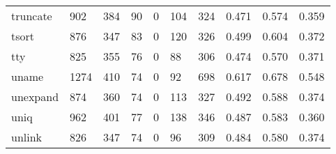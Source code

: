 \begin{longtable}{lp{2.0cm}p{2.0cm}p{2.0cm}p{2.0cm}p{2.0cm}p{2.0cm}p{2.0cm}p{2.0cm}p{2.0cm}}
truncate  &                    902 &                                384 &                                90 &                                0 &                               104 &                             324 &                                   0.471 &                                  0.574 &                                0.359 \\
tsort     &                    876 &                                347 &                                83 &                                0 &                               120 &                             326 &                                   0.499 &                                  0.604 &                                0.372 \\
tty       &                    825 &                                355 &                                76 &                                0 &                                88 &                             306 &                                   0.474 &                                  0.570 &                                0.371 \\
uname     &                   1274 &                                410 &                                74 &                                0 &                                92 &                             698 &                                   0.617 &                                  0.678 &                                0.548 \\
unexpand  &                    874 &                                360 &                                74 &                                0 &                               113 &                             327 &                                   0.492 &                                  0.588 &                                0.374 \\
uniq      &                    962 &                                401 &                                77 &                                0 &                               138 &                             346 &                                   0.487 &                                  0.583 &                                0.360 \\
unlink    &                    826 &                                347 &                                74 &                                0 &                                96 &                             309 &                                   0.484 &                                  0.580 &                                0.374 \\

\end{longtable}

